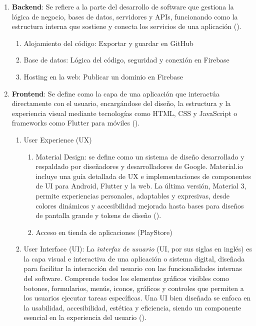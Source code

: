 \begin{enumerate}
  \item \textbf{Backend}: Se refiere a la parte del desarrollo de software que gestiona la lógica de negocio, bases de datos, servidores y APIs, funcionando como la estructura interna que sostiene y conecta los servicios de una aplicación (\cite{backend}).
  \begin{enumerate}
    \item Alojamiento del código: Exportar y guardar en GitHub
    \item Base de datos: Lógica del código, seguridad y conexión en Firebase
    \item Hosting en la web: Publicar un dominio en Firebase
  \end{enumerate}
  \item \textbf{Frontend}: Se define como  la capa de una aplicación que interactúa directamente con el usuario, encargándose del diseño, la estructura y la experiencia visual mediante tecnologías como HTML, CSS y JavaScript o frameworks como Flutter para móviles (\cite{frontend}).
  \begin{enumerate}
    \item User Experience (UX)
     \begin{enumerate}
      \item Material Design: se define como un sistema de diseño desarrollado y respaldado por diseñadores y desarrolladores de Google. Material.io incluye una guía detallada de UX e implementaciones de componentes de UI para Android, Flutter y la web. La última versión, Material 3, permite experiencias personales, adaptables y expresivas, desde colores dinámicos y accesibilidad mejorada hasta bases para diseños de pantalla grande y tokens de diseño (\cite{materialdesign2023}).
      \item Acceso en tienda de aplicaciones (PlayStore)
     \end{enumerate}
    \item User Interface (UI): La \textit{interfaz de usuario} (UI, por sus siglas en inglés) es la capa visual e interactiva de una aplicación o sistema digital, diseñada para facilitar la interacción del usuario con las funcionalidades internas del software. Comprende todos los elementos gráficos visibles como botones, formularios, menús, iconos, gráficos y controles que permiten a los usuarios ejecutar tareas específicas. Una UI bien diseñada se enfoca en la usabilidad, accesibilidad, estética y eficiencia, siendo un componente esencial en la experiencia del usuario (\cite{shneiderman}).

\end{enumerate}
\end{enumerate}
